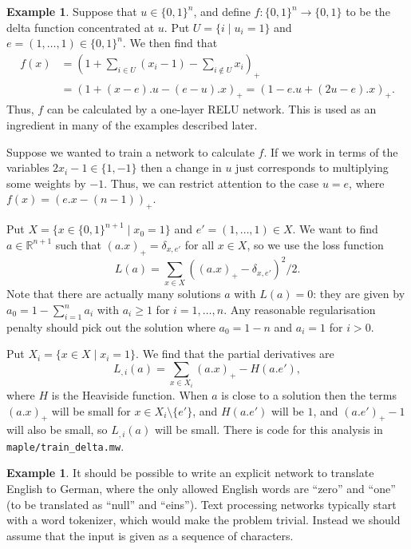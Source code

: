 \documentclass{amsart}
\newcommand{\R}         {{\mathbb{R}}}
\newcommand{\dl}        {\delta}
\newcommand{\sm}        {\setminus}
\newcommand{\st}        {\;|\;}
\renewcommand{\:}{\colon}
\theoremstyle{definition}
\newtheorem{example}[theorem]{Example}
\begin{document}
\begin{example}\label{eg-delta}
 Suppose that $u\in\{0,1\}^n$, and define $f\:\{0,1\}^n\to\{0,1\}$ to
 be the delta function concentrated at $u$.  Put $U=\{i\st u_i=1\}$
 and $e=(1,\dotsc,1)\in\{0,1\}^n$.  We then find that 
 \begin{align*}
  f(x) &=
   \left(1+\sum_{i\in U}(x_i-1)-\sum_{i\not\in U}x_i\right)_+  \\
  &= \left(1 + (x - e).u - (e-u).x\right)_+ 
   = \left(1-e.u+(2u-e).x\right)_+.
 \end{align*}
 Thus, $f$ can be calculated by a one-layer RELU network.  This is
 used as an ingredient in many of the examples described later.

 Suppose we wanted to train a network to calculate $f$.  If we work in
 terms of the variables $2x_i-1\in\{1,-1\}$ then a change in $u$ just
 corresponds to multiplying some weights by $-1$.  Thus, we can
 restrict attention to the case $u=e$, where $f(x)=(e.x-(n-1))_+$.  

 Put $X=\{x\in\{0,1\}^{n+1}\st x_0=1\}$ and $e'=(1,\dotsc,1)\in X$.
 We want to find $a\in\R^{n+1}$ such that $(a.x)_+=\dl_{x,e'}$ for all
 $x\in X$, so we use the loss function 
 \[ L(a) = \sum_{x\in X}((a.x)_+-\dl_{x,e'})^2/2. \]
 Note that there are actually many solutions $a$ with $L(a)=0$: they
 are given by $a_0=1-\sum_{i=1}^na_i$ with $a_i\geq 1$ for
 $i=1,\dotsc,n$.  Any reasonable regularisation penalty should pick
 out the solution where $a_0=1-n$ and $a_i=1$ for $i>0$.

 Put $X_i=\{x\in X\st x_i=1\}$.  We find that the partial derivatives
 are 
 \[ L_{,i}(a) = \sum_{x\in X_i}(a.x)_+ - H(a.e'), \]
 where $H$ is the Heaviside function.  When $a$ is close to a solution
 then the terms $(a.x)_+$ will be small for $x\in X_i\sm\{e'\}$, and
 $H(a.e')$ will be $1$, and $(a.e')_+-1$ will also be small, so
 $L_{,i}(a)$ will be small.  There is code for this analysis in
 \texttt{maple/train\_delta.mw}. 
\end{example}

\begin{example}\label{eg-binary-words}
 It should be possible to write an explicit network to translate
 English to German, where the only allowed English words are ``zero''
 and ``one'' (to be translated as ``null'' and ``eins'').  Text
 processing networks typically start with a word tokenizer, which
 would make the problem trivial.  Instead we should assume that the
 input is given as a sequence of characters.
\end{example}
\end{document}
